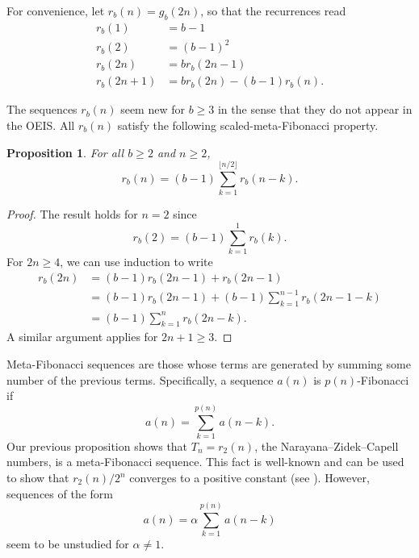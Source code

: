 \documentclass[12pt]{amsart}
\newtheorem{proposition}{Proposition}
\theoremstyle{definition}
\begin{document}
For convenience, let $r_b(n) = g_b(2n)$, so that the recurrences read
\begin{align*}
    r_b(1) &= b - 1 \\
    r_b(2) &= (b - 1)^2 \\
    r_b(2n) &= b r_b(2n - 1) \\
    r_b(2n + 1) &= b r_b(2n) - (b - 1) r_b(n).
\end{align*}

The sequences $r_b(n)$ seem new for $b \geq 3$ in the sense that they do not
appear in the OEIS. All $r_b(n)$ satisfy the following scaled-meta-Fibonacci
property.

\begin{proposition}
    For all $b \geq 2$ and $n \geq 2$,
    \begin{equation*}
        r_b(n) = (b - 1) \sum_{k = 1}^{\lfloor n / 2 \rfloor} r_b(n - k).
    \end{equation*}
\end{proposition}

\begin{proof}
    The result holds for $n = 2$ since
    \begin{equation*}
        r_b(2) = (b - 1) \sum_{k = 1}^1 r_b(k).
    \end{equation*}
    For $2n \geq 4$, we can use induction to write
    \begin{align*}
        r_b(2n) &= (b - 1) r_b(2n - 1) + r_b(2n - 1) \\
                &= (b - 1) r_b(2n - 1) + (b - 1) \sum_{k = 1}^{n - 1} r_b(2n - 1 - k) \\
                &= (b - 1) \sum_{k = 1}^n r_b(2n - k).
    \end{align*}
    A similar argument applies for $2n + 1 \geq 3$.
\end{proof}

Meta-Fibonacci sequences are those whose terms are generated by summing some
number of the previous terms. Specifically, a sequence $a(n)$ is
$p(n)$-Fibonacci if
\begin{equation*}
    a(n) = \sum_{k = 1}^{p(n)} a(n - k).
\end{equation*}
Our previous proposition shows that $T_n = r_2(n)$, the Narayana--Zidek--Capell
numbers, is a meta-Fibonacci sequence. This fact is well-known and can be used
to show that $r_2(n) / 2^n$ converges to a positive constant (see
\cite{emerson2005family}). However, sequences of the form
\begin{equation*}
    a(n) = \alpha \sum_{k = 1}^{p(n)} a(n - k)
\end{equation*}
seem to be unstudied for $\alpha \neq 1$.
\end{document}
